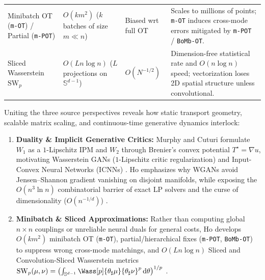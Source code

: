 \documentclass[../../../../master.tex]{subfiles}
\begin{document}
\begin{table}[htbp]
\begin{tabularx}{\textwidth}{@{}>{\raggedright\arraybackslash}p{2.75cm}>{\raggedright\arraybackslash}p{4.15cm}>{\raggedright\arraybackslash}p{2.3cm}>{\raggedright\arraybackslash\hsize=1.0\hsize}X@{}}
Minibatch OT (\texttt{m-OT}) / Partial (\texttt{m-POT}) & $O(k m^2)$ ($k$ batches of size $m \ll n$) & Biased wrt full OT & Scales to millions of points; \texttt{m-OT} induces cross-mode errors mitigated by \texttt{m-POT} / \texttt{BoMb-OT}. \\
Sliced Wasserstein $\mathrm{SW}_p$ & $O(L n \log n)$ ($L$ projections on $\mathbb{S}^{d-1}$) & $O(N^{-1/2})$ & Dimension-free statistical rate and $O(n\log n)$ speed; vectorization loses 2D spatial structure unless convolutional. \\
\bottomrule
\end{tabularx}
\end{table}

\begin{crossbook}
\label{cb:ot:synthesis}
Uniting the three source perspectives reveals how static transport geometry, scalable matrix scaling, and continuous-time generative dynamics interlock:
\begin{enumerate}[leftmargin=1.4em]
  \item \textbf{Duality \& Implicit Generative Critics:} Murphy and Cuturi formulate $W_1$ as a $1$-Lipschitz IPM and $W_2$ through Brenier's convex potential $T^\star = \nabla u$, motivating Wasserstein GANs ($1$-Lipschitz critic regularization) and Input-Convex Neural Networks (ICNNs) . Ho emphasizes why WGANs avoid Jensen--Shannon gradient vanishing on disjoint manifolds, while exposing the $O(n^3 \ln n)$ combinatorial barrier of exact LP solvers and the curse of dimensionality ($O(n^{-1/d})$) .
  \item \textbf{Minibatch \& Sliced Approximations:} Rather than computing global $n \times n$ couplings or unreliable neural duals for general costs, Ho develops $O(k m^2)$ minibatch OT (\texttt{m-OT}), partial/hierarchical fixes (\texttt{m-POT}, \texttt{BoMb-OT}) to suppress wrong cross-mode matchings, and $O(L n \log n)$ Sliced and Convolution-Sliced Wasserstein metrics $\mathrm{SW}_p(\mu, \nu) = \bigl(\int_{\mathbb{S}^{d-1}} \Wass[p]{\theta_\sharp\mu}{\theta_\sharp\nu}^p\,\mathrm{d}\theta\bigr)^{1/p}$ .

\end{enumerate}
\end{crossbook}
\end{document}
